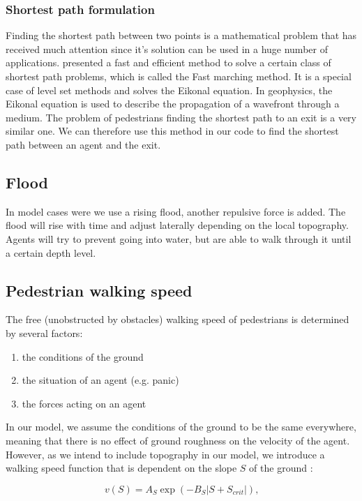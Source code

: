 \documentclass[11pt]{article}
\begin{document}
\subsubsection{Shortest path formulation}
Finding the shortest path between two points is a mathematical problem that has received much attention since it's solution can be used in a huge number of applications. \citet{Sethian} presented a fast and efficient method to solve a certain class of shortest path problems, which is called the Fast marching method. It is a special case of level set methods and solves the Eikonal equation. 
In geophysics, the Eikonal equation is used to describe the propagation of a wavefront through a medium. The problem of pedestrians finding the shortest path to an exit is a very similar one. We can therefore use this method in our code to find the shortest path between an agent and the exit.

\subsection{Flood}

In model cases were we use a rising flood, another repulsive force is added. The flood will rise with time and adjust laterally depending on the local topography. Agents will try to prevent going into water, but are able to walk through it until a certain depth level.

\subsection{Pedestrian walking speed}

The free (unobstructed by obstacles) walking speed of pedestrians is determined by several factors:

\begin{enumerate}
\item the conditions of the ground
\item the situation of an agent (e.g. panic)
\item the forces acting on an agent
\end{enumerate}

In our model, we assume the conditions of the ground to be the same everywhere, meaning that there is no effect of ground roughness on the velocity of the agent. However, as we intend to include topography in our model, we introduce a walking speed function that is dependent on the slope $S$ of the ground \citep{tobler}:

\begin{equation}
	v(S) = A_{S} \exp{\left( -B_S | S + S_{crit} |  \right)}\mbox{,}
\end{equation}
\end{document}

